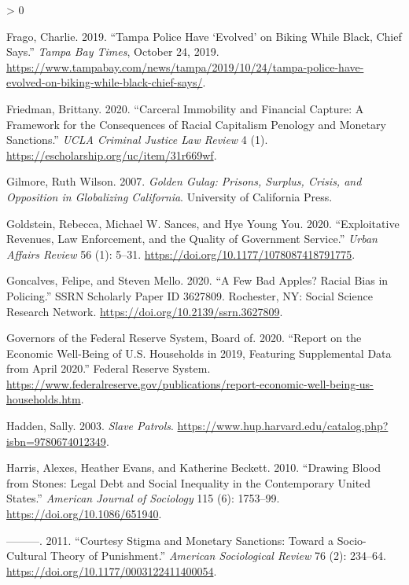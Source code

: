 \documentclass[
  12pt,
]{article}
\newlength{\cslhangindent}
\newenvironment{CSLReferences}[2] %
 {%
  \setlength{\parindent}{0pt}
  \ifodd #1 \everypar{\setlength{\hangindent}{\cslhangindent}}\ignorespaces\fi
  \ifnum #2 > 0
  \setlength{\parskip}{#2\baselineskip}
  \fi
 }%
 {}
\begin{document}
\begin{CSLReferences}{1}{0}
\leavevmode\hypertarget{ref-Frago2019}{}%
Frago, Charlie. 2019. {``Tampa Police Have {`Evolved'} on Biking While Black, Chief Says.''} \emph{Tampa Bay Times}, October 24, 2019. \url{https://www.tampabay.com/news/tampa/2019/10/24/tampa-police-have-evolved-on-biking-while-black-chief-says/}.

\leavevmode\hypertarget{ref-Friedman2020}{}%
Friedman, Brittany. 2020. {``Carceral {Immobility} and {Financial Capture}: {A Framework} for the {Consequences} of {Racial Capitalism Penology} and {Monetary Sanctions}.''} \emph{UCLA Criminal Justice Law Review} 4 (1). \url{https://escholarship.org/uc/item/31r669wf}.

\leavevmode\hypertarget{ref-Gilmore2007}{}%
Gilmore, Ruth Wilson. 2007. \emph{Golden {Gulag}: {Prisons}, {Surplus}, {Crisis}, and {Opposition} in {Globalizing California}}. {University of California Press}.

\leavevmode\hypertarget{ref-Goldstein2020}{}%
Goldstein, Rebecca, Michael W. Sances, and Hye Young You. 2020. {``Exploitative {Revenues}, {Law Enforcement}, and the {Quality} of {Government Service}.''} \emph{Urban Affairs Review} 56 (1): 5--31. \url{https://doi.org/10.1177/1078087418791775}.

\leavevmode\hypertarget{ref-Goncalves2020}{}%
Goncalves, Felipe, and Steven Mello. 2020. {``A {Few Bad Apples}? {Racial Bias} in {Policing}.''} SSRN Scholarly Paper ID 3627809. {Rochester, NY}: {Social Science Research Network}. \url{https://doi.org/10.2139/ssrn.3627809}.

\leavevmode\hypertarget{ref-BoardofGovernorsoftheFederalReserveSystem2020}{}%
Governors of the Federal Reserve System, Board of. 2020. {``Report on the {Economic Well}-{Being} of {U}.{S}. {Households} in 2019, {Featuring Supplemental Data} from {April} 2020.''} {Federal Reserve System}. \url{https://www.federalreserve.gov/publications/report-economic-well-being-us-households.htm}.

\leavevmode\hypertarget{ref-Hadden2003}{}%
Hadden, Sally. 2003. \emph{Slave {Patrols}}. \url{https://www.hup.harvard.edu/catalog.php?isbn=9780674012349}.

\leavevmode\hypertarget{ref-Harris2010}{}%
Harris, Alexes, Heather Evans, and Katherine Beckett. 2010. {``Drawing {Blood} from {Stones}: {Legal Debt} and {Social Inequality} in the {Contemporary United States}.''} \emph{American Journal of Sociology} 115 (6): 1753--99. \url{https://doi.org/10.1086/651940}.

\leavevmode\hypertarget{ref-Harris2011}{}%
---------. 2011. {``Courtesy {Stigma} and {Monetary Sanctions}: {Toward} a {Socio}-{Cultural Theory} of {Punishment}.''} \emph{American Sociological Review} 76 (2): 234--64. \url{https://doi.org/10.1177/0003122411400054}.


\end{CSLReferences}
\end{document}
